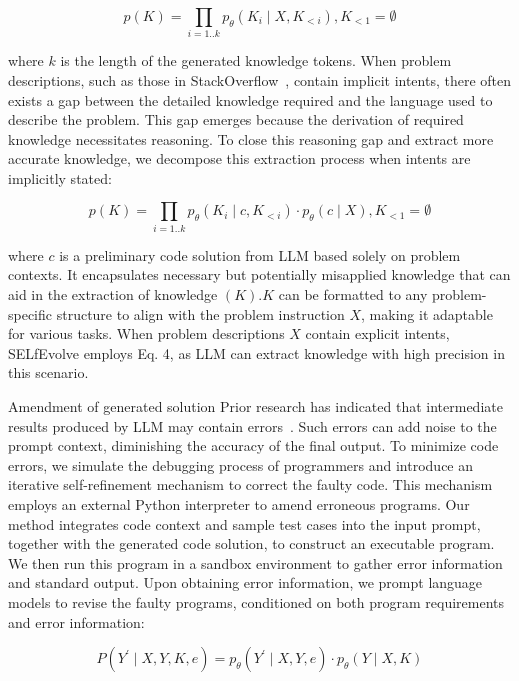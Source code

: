\documentclass[a4paper,oneside]{book}
\begin{document}
\begin{equation}
    p(K)=\prod_{i=1 . . k} p_{\theta}\left(K_{i} \mid X, K_{<i}\right), K_{<1}=\emptyset
\end{equation}

where $k$ is the length of the generated knowledge tokens. When problem descriptions, such as those in StackOverflow~\cite{pmlr-v202-lai23b}, contain implicit intents, there often exists a gap between the detailed knowledge required and the language used to describe the problem. This gap emerges because the derivation of required knowledge necessitates reasoning. To close this reasoning gap and extract more accurate knowledge, we decompose this extraction process when intents are implicitly stated:

\begin{equation}
    p(K)=\prod_{i=1 . . k} p_{\theta}\left(K_{i} \mid c, K_{<i}\right) \cdot p_{\theta}(c \mid X), K_{<1}=\emptyset
\end{equation}

where $c$ is a preliminary code solution from LLM based solely on problem contexts. It encapsulates necessary but potentially misapplied knowledge that can aid in the extraction of knowledge $(K) . K$ can be formatted to any problem-specific structure to align with the problem instruction $X$, making it adaptable for various tasks. When problem descriptions $X$ contain explicit intents, SELfEvolve employs Eq. 4, as LLM can extract knowledge with high precision in this scenario.

Amendment of generated solution Prior research has indicated that intermediate results produced by LLM may contain errors~\cite{lyu2023faithful, wang2022self, wei2022chain, zhang2022automatic}. Such errors can add noise to the prompt context, diminishing the accuracy of the final output. To minimize code errors, we simulate the debugging process of programmers and introduce an iterative self-refinement mechanism to correct the faulty code. This mechanism employs an external Python interpreter to amend erroneous programs. Our method integrates code context and sample test cases into the input prompt, together with the generated code solution, to construct an executable program. We then run this program in a sandbox environment to gather error information and standard output. Upon obtaining error information, we prompt language models to revise the faulty programs, conditioned on both program requirements and error information:

\begin{equation}
    P\left(Y^{\prime} \mid X, Y, K, e\right)=p_{\theta}\left(Y^{\prime} \mid X, Y, e\right) \cdot p_{\theta}(Y \mid X, K)
\end{equation}
\end{document}
